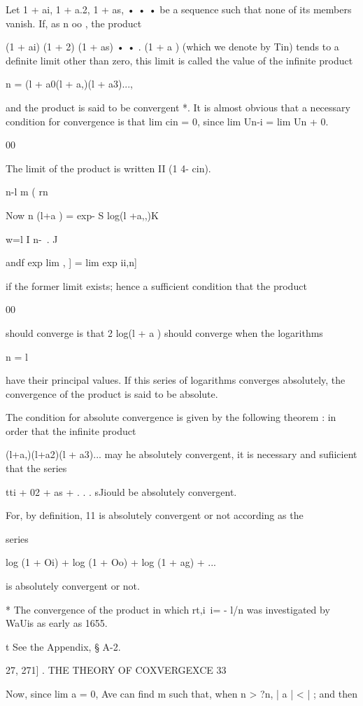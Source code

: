 Let 1 + ai, 1 + a.2, 1 + as, • • • be a sequence such that none of its
members vanish. If, as n oo , the product

(1 + ai) (1 + 2) (1 + as) • • . (1 + a ) (which we denote by Tin)
tends to a definite limit other than zero, this limit is called the
value of the infinite product

n = (l + a0(l + a,)(l + a3)...,

and the product is said to be convergent *. It is almost obvious that
a necessary condition for convergence is that lim cin = 0, since lim
Un-i = lim Un + 0.

00

The limit of the product is written II (1 4- cin).

n-l m ( rn \

Now n (l+a ) = exp- S log(l +a,,)K

w=l I n-\ . J

andf exp lim , ] = lim exp ii,n]

if the former limit exists; hence a sufficient condition that the
product

00

should converge is that 2 log(l + a ) should converge when the
logarithms

n = l

have their principal values. If this series of logarithms converges
absolutely, the convergence of the product is said to be absolute.

The condition for absolute convergence is given by the following
theorem : in order that the infinite product

(l+a,)(l+a2)(l + a3)... may he absolutely convergent, it is necessary
and sufiicient that the series

tti + 02 + as + . . . sJiould be absolutely convergent.

For, by definition, 11 is absolutely convergent or not according as
the

series

log (1 + Oi) + log (1 + Oo) + log (1 + ag) + ...

is absolutely convergent or not.

* The convergence of the product in which rt,i\ i= - l/n was
investigated by WaUis as early as 1655.

t See the Appendix, § A-2.



27, 271] . THE THEORY OF COXVERGEXCE 33

Now, since lim a = 0, Ave can find m such that, when n > ?n, | a | < |
; and then



